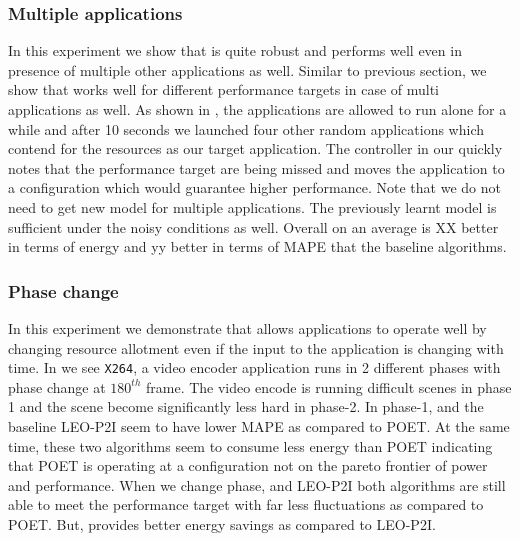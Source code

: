 \subsubsection{Multiple applications}
In this experiment we show that \SYSTEM{} is quite robust and performs well even in presence of multiple other applications as well. Similar to previous section, we show that \SYSTEM{} works well for different performance targets in case of multi applications as well. As shown in , the applications are allowed to run alone for a while and after 10 seconds we launched four other random applications which contend for the resources as our target application. The controller in our \SYSTEM{} quickly notes that the performance target are being missed and moves the application to a configuration which would guarantee higher performance. Note that we do not need to get new model for multiple applications. The previously learnt model is sufficient under the noisy conditions as well. Overall on an average \SYSTEM{} is XX better in terms of energy  and yy better in terms of MAPE that the baseline algorithms. %


\subsubsection{Phase change}
In this experiment we demonstrate that \SYSTEM{} allows applications to operate well by changing resource allotment even if the input to the application is changing with time. In  we see \texttt{X264}, a video encoder application runs in 2 different phases with phase change at $180^{th}$ frame. The video encode is running difficult scenes in phase 1 and the scene become significantly less hard in phase-2. In phase-1, \SYSTEM{} and the baseline LEO-P2I seem to have lower MAPE as compared to POET. At the same time, these two algorithms seem to consume less energy than POET indicating that POET is operating at a configuration not on the pareto frontier of power and performance. When we change phase, \SYSTEM{} and LEO-P2I both algorithms are still able to meet the performance target with far less fluctuations as compared to POET. But, \SYSTEM{} provides better energy savings as compared to LEO-P2I.

